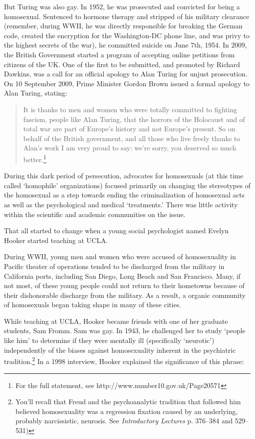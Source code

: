 \begin{refsection}
But Turing was also gay. In 1952, he was prosecuted and convicted for being a homosexual. Sentenced to hormone therapy and stripped of his military clearance (remember, during WWII, he was directly responsible for breaking the German code, created the encryption for the Washington-DC phone line, and was privy to the highest secrets of the war), he committed suicide on June 7th, 1954. In 2009, the British Government started a program of accepting online petitions from citizens of the UK. One of the first to be submitted, and promoted by Richard Dawkins, was a call for an official apology to Alan Turing for unjust prosecution. On 10 September 2009, Prime Minister Gordon Brown issued a formal apology to Alan Turing, stating:

\begin{quote}

It is thanks to men and women who were totally committed to fighting fascism, people like Alan Turing, that the horrors of the Holocaust and of total war are part of Europe’s history and not Europe’s present. So on behalf of the British government, and all those who live freely thanks to Alan’s work I am very proud to say: we’re sorry, you deserved so much better.\footnote{For the full statement, see http:\slash \slash www.number10.gov.uk\slash Page20571}
\end{quote}

During this dark period of persecution, advocates for homosexuals (at this time called `homophile' organizations) focused primarily on changing the stereotypes of the homosexual as a step towards ending the criminalization of homosexual acts as well as the psychological and medical `treatments.' There was little activity within the scientific and academic communities on the issue. 

That all started to change when a young social psychologist named Evelyn Hooker started teaching at UCLA.

During WWII, young men and women who were accused of homosexuality in Pacific theater of operations tended to be discharged from the military in California ports, including San Diego, Long Beach and San Francisco. Many, if not most, of these young people could not return to their hometowns because of their dishonorable discharge from the military. As a result, a organic community of homosexuals began taking shape in many of these cities.

While teaching at UCLA, Hooker became friends with one of her graduate students, Sam Fromm. Sam was gay. In 1943, he challenged her to study `people like him' to determine if they were mentally ill (specifically `neurotic') independently of the biases against homosexuality inherent in the psychiatric tradition.\footnote{You'll recall that Freud and the psychoanalytic tradition that followed him believed homosexuality was a regression fixation caused by an underlying, probably narcissistic, neurosis. See \emph{Introductory Lectures} p. 376--384 and 529--531)} In a 1998 interview, Hooker explained the significance of this phrase:


\end{refsection}
